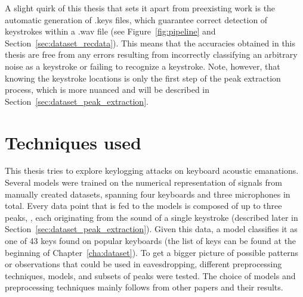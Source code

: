 \documentclass[../main.tex]{subfiles}
\begin{document}
A slight quirk of this thesis that sets it apart from preexisting work is the automatic generation of .keys files, which guarantee correct detection of keystrokes within a .wav file (see Figure~\ref{fig:pipeline} and Section~\ref{sec:dataset_recdata}). This means that the accuracies obtained in this thesis are free from any errors resulting from incorrectly classifying an arbitrary noise as a keystroke or failing to recognize a keystroke. Note, however, that knowing the keystroke locations is only the first step of the peak extraction process, which is more nuanced and will be described in Section~\ref{sec:dataset_peak_extraction}.



\section{Techniques used}
\label{sec:intro_techniques}
This thesis tries to explore keylogging attacks on keyboard acoustic emanations. Several models were trained on the numerical representation of signals from manually created datasets, spanning four keyboards and three microphones in total. Every data point that is fed to the models is composed of up to three peaks, , each originating from the sound of a single keystroke (described later in Section~\ref{sec:dataset_peak_extraction}). Given this data, a model classifies it as one of 43 keys found on popular keyboards (the list of keys can be found at the beginning of Chapter~\ref{cha:dataset}). To get a bigger picture of possible patterns or observations that could be used in eavesdropping, different preprocessing techniques, models, and subsets of peaks were tested. The choice of models and preprocessing techniques mainly follows from other papers and their results.
\end{document}

